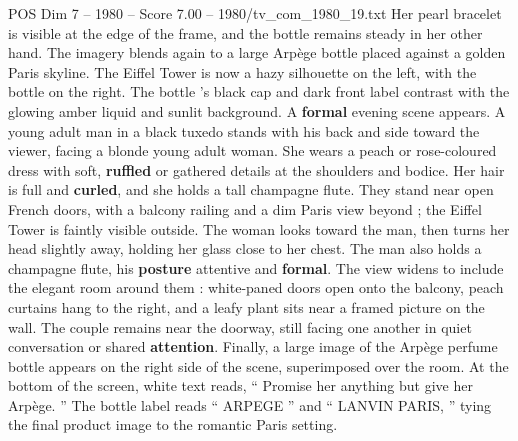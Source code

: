 \begin{textsample}{POS Dim 7 – 1980 – Score 7.00 – 1980/tv\_com\_1980\_19.txt}
Her pearl bracelet is visible at the edge of the frame, and the bottle remains steady in her other hand.
The imagery blends again to a large Arpège bottle placed against a golden Paris skyline.
The Eiffel Tower is now a hazy silhouette on the left, with the bottle on the right.
The bottle ’s black cap and dark front label contrast with the glowing amber liquid and sunlit background.
A \textbf{formal} evening scene appears.
A young adult man in a black tuxedo stands with his back and side toward the viewer, facing a blonde young adult woman.
She wears a peach or rose-coloured dress with soft, \textbf{ruffled} or gathered details at the shoulders and bodice.
Her hair is full and \textbf{curled}, and she holds a tall champagne flute.
They stand near open French doors, with a balcony railing and a dim Paris view beyond ; the Eiffel Tower is faintly visible outside.
The woman looks toward the man, then turns her head slightly away, holding her glass close to her chest.
The man also holds a champagne flute, his \textbf{posture} attentive and \textbf{formal}.
The view widens to include the elegant room around them : white-paned doors open onto the balcony, peach curtains hang to the right, and a leafy plant sits near a framed picture on the wall.
The couple remains near the doorway, still facing one another in quiet conversation or shared \textbf{attention}.
Finally, a large image of the Arpège perfume bottle appears on the right side of the scene, superimposed over the room.
At the bottom of the screen, white text reads, “ Promise her anything but give her Arpège. ” The bottle label reads “ ARPEGE ” and “ LANVIN PARIS, ” tying the final product image to the romantic Paris setting.

\end{textsample}
